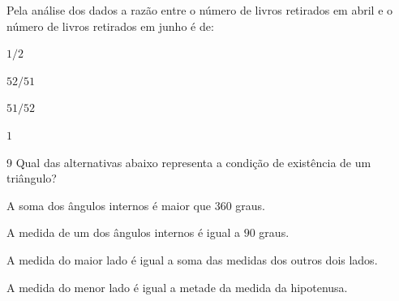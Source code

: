 Pela análise dos dados a razão entre o número de livros retirados em
abril e o número de livros retirados em junho é de:

\begin{escolha}
\item $1/2$
\item $52/51$
\item $51/52$
\item $1$
\end{escolha}



\num{9}  Qual das alternativas abaixo representa a condição de existência de
um triângulo?

\begin{escolha}
\item A soma dos ângulos internos é maior que $360$ graus. 
\item A medida de um
dos ângulos internos é igual a $90$ graus. 
\item A medida do maior lado é
igual a soma das medidas dos outros dois lados. 
\item A medida do menor
lado é igual a metade da medida da hipotenusa.
\end{escolha}


